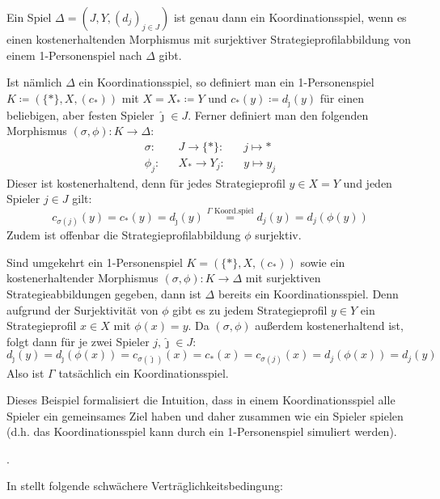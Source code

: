\begin{bsp}\label{bsp:Koordinationsspiel}
	Ein Spiel $\Delta = (J, Y, (d_j)_{j \in J})$ ist genau dann ein Koordinationsspiel, wenn es einen kostenerhaltenden Morphismus mit surjektiver Strategieprofilabbildung von einem 1-Personenspiel nach $\Delta$ gibt.
	
	Ist nämlich $\Delta$ ein Koordinationsspiel, so definiert man ein 1-Personenspiel $K \coloneqq (\{\ast\}, X, (c_\ast))$ mit $X = X_\ast \coloneqq Y$ und $c_\ast(y) \coloneqq d_{\hat{\jmath}}(y)$ für einen beliebigen, aber festen Spieler $\hat{\jmath} \in J$. Ferner definiert man den folgenden Morphismus $(\sigma, \phi): K \to \Delta$:
	\begin{align*}
		\sigma:	&&J		\to	 \{\ast\}:	&&j	\mapsto	\ast  \\
		\phi_j:	&&X_\ast	\to	 Y_j:	&&y	\mapsto	y_j
	\end{align*}	
	Dieser ist kostenerhaltend, denn für jedes Strategieprofil $y \in X = Y$ und jeden Spieler $j \in J$ gilt:
	\[c_{\sigma(j)}(y) = c_\ast(y) = d_{\hat{\jmath}}(y) \overset{\Gamma \text{ Koord.spiel}}{=} d_j(y) = d_j(\phi(y))\]
	Zudem ist offenbar die Strategieprofilabbildung $\phi$ surjektiv.
	
	Sind umgekehrt ein 1-Personenspiel $K = (\{\ast\}, X, (c_\ast))$ sowie ein kostenerhaltender Morphismus  $(\sigma, \phi): K \to \Delta$ mit surjektiven Strategieabbildungen gegeben, dann ist $\Delta$ bereits ein Koordinationsspiel. Denn aufgrund der Surjektivität von $\phi$ gibt es zu jedem Strategieprofil $y \in Y$ ein Strategieprofil $x \in X$ mit $\phi(x) = y$. Da $(\sigma, \phi)$ außerdem kostenerhaltend ist, folgt dann für je zwei Spieler $j, \hat{\jmath} \in J$: 
		\[d_{\hat{\jmath}}(y) = d_{\hat{\jmath}}(\phi(x)) = c_{\sigma(\hat{\jmath})}(x) = c_\ast(x) = c_{\sigma(j)}(x) = d_j(\phi(x)) = d_j(y)\]
	Also ist $\Gamma$ tatsächlich ein Koordinationsspiel.
\end{bsp}

Dieses Beispiel formalisiert die Intuition, dass in einem Koordinationsspiel alle Spieler ein gemeinsames Ziel haben und daher zusammen \glqq wie ein Spieler\grqq{} spielen (d.h. das Koordinationsspiel kann durch ein 1-Personenspiel simuliert werden).

\begin{bsp}.
	
\end{bsp}

In \cite{LapGameCat} stellt \citeauthor{LapGameCat} folgende schwächere Verträglichkeitsbedingung:

